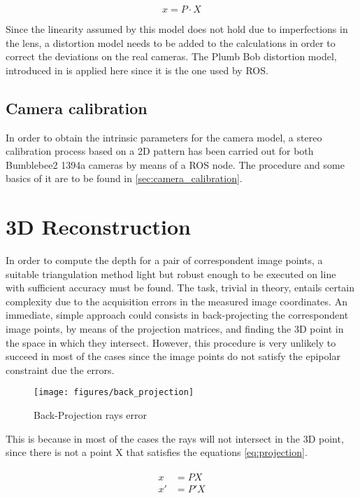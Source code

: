 \begin{equation}
x = P \cdot X
\label{eq:pinhole_model}
\end{equation}

Since the linearity assumed by this model does not hold due to imperfections in the lens, a distortion model needs to be added to the calculations in order to correct the deviations on the real cameras.
The Plumb Bob distortion model, introduced in \cite{Brown} is applied here since it is the one used by ROS.


\subsection{Camera calibration}
\label{sec:cam_calib}
In order to obtain the intrinsic parameters for the camera model, a stereo calibration process based on a 2D pattern has been carried out for both Bumblebee2 1394a cameras by means of a ROS node. The procedure and some basics of it are to be found in \ref{sec:camera_calibration}.

\section{3D Reconstruction}
In order to compute the depth for a pair of correspondent image points, a suitable triangulation method light but robust enough to be executed on line with sufficient accuracy must be found.
The task, trivial in theory, entails certain complexity due to the acquisition errors in the measured image coordinates.
An immediate, simple approach could consists in back-projecting the correspondent image points, by means of the projection matrices, and finding the 3D point in the space in which they intersect.
However, this procedure is very unlikely to succeed in most of the cases since the image points do not satisfy the epipolar constraint due the errors.

\begin{figure}[h]
    \centering
    \texttt{[image: figures/back\_projection]}
    \caption{Back-Projection rays error}
    \label{fig:Back-Projection}
\end{figure}

This is because in most of the cases the rays will not intersect in the 3D point, since there is not a point X that satisfies the equations \eqref{eq:projection}.

\begin{align}
\begin{split}
	x  &= P X\\
	x' &= P' X
	\label{eq:projection}
\end{split}
\end{align}


